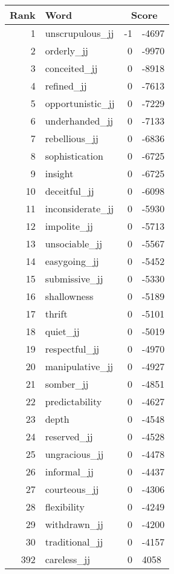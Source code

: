 \begin{longtable}[!htbp]{| rlr@{.}l |}
    \hline
    \textbf{Rank} & \textbf{Word} & \multicolumn{2}{c|}{\textbf{Score}} \\
    \hline
    \endhead
    1 & unscrupulous\_jj & -1 & -4697 \\
    2 & orderly\_jj & 0 & -9970 \\
    3 & conceited\_jj & 0 & -8918 \\
    4 & refined\_jj & 0 & -7613 \\
    5 & opportunistic\_jj & 0 & -7229 \\
    6 & underhanded\_jj & 0 & -7133 \\
    7 & rebellious\_jj & 0 & -6836 \\
    8 & sophistication & 0 & -6725 \\
    9 & insight & 0 & -6725 \\
    10 & deceitful\_jj & 0 & -6098 \\
    11 & inconsiderate\_jj & 0 & -5930 \\
    12 & impolite\_jj & 0 & -5713 \\
    13 & unsociable\_jj & 0 & -5567 \\
    14 & easygoing\_jj & 0 & -5452 \\
    15 & submissive\_jj & 0 & -5330 \\
    16 & shallowness & 0 & -5189 \\
    17 & thrift & 0 & -5101 \\
    18 & quiet\_jj & 0 & -5019 \\
    19 & respectful\_jj & 0 & -4970 \\
    20 & manipulative\_jj & 0 & -4927 \\
    21 & somber\_jj & 0 & -4851 \\
    22 & predictability & 0 & -4627 \\
    23 & depth & 0 & -4548 \\
    24 & reserved\_jj & 0 & -4528 \\
    25 & ungracious\_jj & 0 & -4478 \\
    26 & informal\_jj & 0 & -4437 \\
    27 & courteous\_jj & 0 & -4306 \\
    28 & flexibility & 0 & -4249 \\
    29 & withdrawn\_jj & 0 & -4200 \\
    30 & traditional\_jj & 0 & -4157 \\
    392 & careless\_jj & 0 & 4058 \\

\end{longtable}
